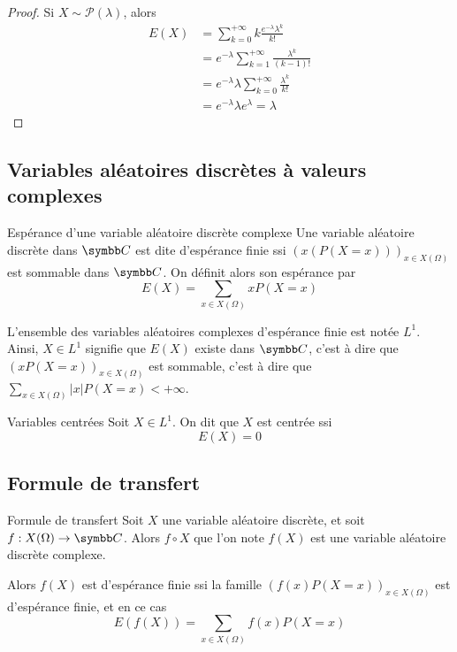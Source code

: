 \begin{proof}
    Si $X \sim \mathcal P(\lambda)$, alors 
    \begin{align}
        E(X) & = \sum_{k = 0}^{+ \infty} k \frac{e^{- \lambda} \lambda^k}{k!} \\
        & = e^{- \lambda} \sum_{k = 1}^{+ \infty} \frac{\lambda^k}{(k - 1)!} \\
        & = e^{- \lambda} \lambda \sum_{k = 0}^{+ \infty} \frac{\lambda^k}{k!} \\
        & = e^{- \lambda} \lambda e^{\lambda} = \lambda
    \end{align}
\end{proof}

\subsection{Variables aléatoires discrètes à valeurs complexes}

\begin{definition}{Espérance d'une variable aléatoire discrète complexe}{}
    Une variable aléatoire discrète dans $\C$ est dite d'espérance finie ssi 
    $(x(P(X = x)))_{x \in X(\Omega)}$ est sommable dans $\C$. On définit alors 
    son espérance par 
    $$ E(X) = \sum_{x \in X(\Omega)} x P(X = x) $$

    L'ensemble des variables aléatoires complexes d'espérance finie est notée $L^1$.
    Ainsi, $X \in L^1$ signifie que $E(X)$ existe dans $\C$, c'est à dire que 
    $(x P(X = x))_{x \in X(\Omega)}$ est sommable, c'est à dire que 
    $\displaystyle \sum_{x \in X(\Omega)} |x| P(X = x) < + \infty   $.
\end{definition}

\begin{definition}{Variables centrées}{}
    Soit $X \in L^1$. On dit que $X$ est centrée ssi 
    $$ E(X) = 0 $$    
\end{definition}

\subsection{Formule de transfert}

\begin{theoreme}{Formule de transfert}{}
    Soit $X$ une variable aléatoire discrète, et soit $f : X(\Omega) \to \C$.
    Alors $f \circ X$ que l'on note $f(X)$ est une variable aléatoire discrète complexe. 

    Alors $f(X)$ est d'espérance finie ssi la famille $(f(x) P(X = x))_{x \in X(\Omega)}$ 
    est d'espérance finie, et en ce cas
    $$ E(f(X)) = \sum_{x \in X(\Omega)} f(x) P(X = x) $$
\end{theoreme}

